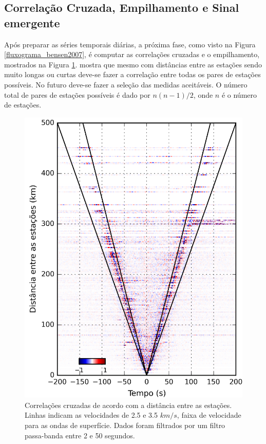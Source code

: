 \subsection{Correlação Cruzada, Empilhamento e  Sinal emergente}

Após preparar as séries temporais diárias, a próxima fase, como visto na Figura \ref{fluxograma_bensen2007}, é computar as correlações cruzadas e o empilhamento, mostrados na Figura \ref{correlacao_cruzada}. \cite{bensen_processing_2007} mostra que mesmo com distâncias entre as estações sendo muito longas ou curtas deve-se fazer a correlação entre todas os pares de estações possíveis. No futuro deve-se fazer a seleção das medidas aceitáveis. O número total de pares de estações possíveis é dado por $n(n-1)/2$, onde $n$ é o número de estações.

\begin{figure}[!ht]
\centering
\includegraphics[scale=0.2]{Figs/correlaca_cruzada.png}
\caption[Correlações cruzadas de acordo com a distância entre as estações.]{Correlações cruzadas de acordo com a distância entre as estações. Linhas indicam as velocidades de 2.5 e 3.5 $km/s$, faixa de velocidade para as ondas de superfície. Dados foram filtrados por um filtro passa-banda entre 2 e 50 segundos.}
\label{correlacao_cruzada}
\end{figure} 

